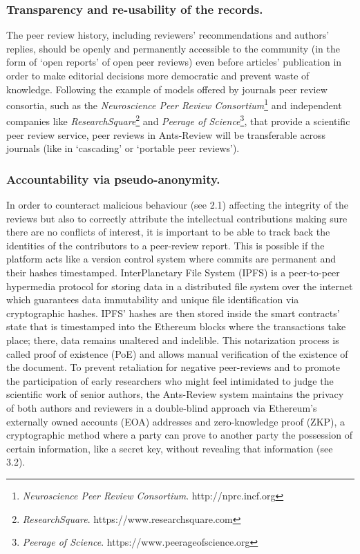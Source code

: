 \documentclass[runningheads]{llncs}
\begin{document}
\subsubsection{Transparency and re-usability of the records.} The peer review history, including reviewers' recommendations and authors' replies, should be openly and permanently accessible to the community (in the form of `open reports' of open peer reviews) even before articles' publication in order to  make editorial decisions more democratic and prevent waste of knowledge. Following the example of models offered by journals peer review consortia, such as the \emph{Neuroscience Peer Review Consortium}\footnote[4]{\emph{Neuroscience Peer Review Consortium}. http://nprc.incf.org} and independent companies like \emph{ResearchSquare}\footnote[5]{\emph{ResearchSquare}. https://www.researchsquare.com} and \emph{Peerage of Science}\footnote[6]{\emph{Peerage of Science}.  https://www.peerageofscience.org}, that provide a scientific peer review service, peer reviews in Ants-Review will be transferable across journals (like in `cascading' or `portable peer reviews').

\subsubsection{Accountability via pseudo-anonymity.} In order to counteract malicious behaviour (see 2.1) affecting the integrity of the reviews but also to correctly attribute the intellectual contributions making sure there are no conflicts of interest, it is important to be able to track back the identities of the contributors to a peer-review report. This is possible if the platform acts like a version control system where commits are permanent and their hashes timestamped. InterPlanetary File System (IPFS) \cite{IPFS} is a peer-to-peer hypermedia protocol for storing data in a distributed file system over the internet which guarantees data immutability and unique file identification via cryptographic hashes. IPFS' hashes are then stored inside the smart contracts' state that is timestamped into the Ethereum blocks where  the transactions take place; there, data remains unaltered and indelible. This notarization process is called proof of existence (PoE) and allows manual verification of the existence of the document.
\newline To prevent retaliation for negative peer-reviews and to promote the participation of early researchers who might feel intimidated to judge the scientific work of senior authors, the Ants-Review system maintains the privacy of both authors and reviewers in a double-blind approach via Ethereum’s externally owned accounts (EOA) addresses and zero-knowledge proof (ZKP), a cryptographic method where a party can prove to another party the possession of certain information, like a secret key, without revealing that information (see 3.2).
\end{document}
